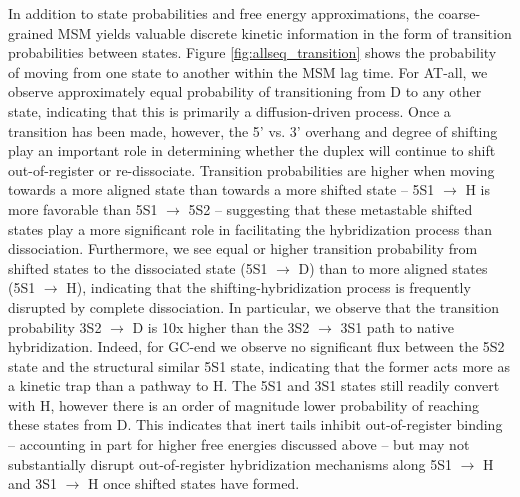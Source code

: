 \documentclass[journal=jpcbfk,manuscript=article]{achemso}
\begin{document}
In addition to state probabilities and free energy approximations, the coarse-grained MSM yields valuable discrete kinetic information in the form of transition probabilities between states. Figure \ref{fig:allseq_transition} shows the probability of moving from one state to another within the MSM lag time. For AT-all, we observe approximately equal probability of transitioning from D to any other state, indicating that this is primarily a diffusion-driven process. Once a transition has been made, however, the 5' vs. 3' overhang and degree of shifting play an important role in determining whether the duplex will continue to shift out-of-register or re-dissociate. Transition probabilities are higher when moving towards a more aligned state than towards a more shifted state -- 5S1 $\rightarrow$ H is more favorable than 5S1 $\rightarrow$ 5S2 -- suggesting that these metastable shifted states play a more significant role in facilitating the hybridization process than dissociation. Furthermore, we see equal or higher transition probability from shifted states to the dissociated state (5S1 $\rightarrow$ D) than to more aligned states (5S1 $\rightarrow$ H), indicating that the shifting-hybridization process is frequently disrupted by complete dissociation. In particular, we observe that the transition probability 3S2 $\rightarrow$ D is 10x higher than the 3S2 $\rightarrow$ 3S1 path to native hybridization. Indeed, for GC-end we observe no significant flux between the 5S2 state and the structural similar 5S1 state, indicating that the former acts more as a kinetic trap than a pathway to H. The 5S1 and 3S1 states still readily convert with H, however there is an order of magnitude lower probability of reaching these states from D. This indicates that inert tails inhibit out-of-register binding -- accounting in part for higher free energies discussed above -- but may not substantially disrupt out-of-register hybridization mechanisms along 5S1 $\rightarrow$ H and 3S1 $\rightarrow$ H once shifted states have formed.

\end{document}

